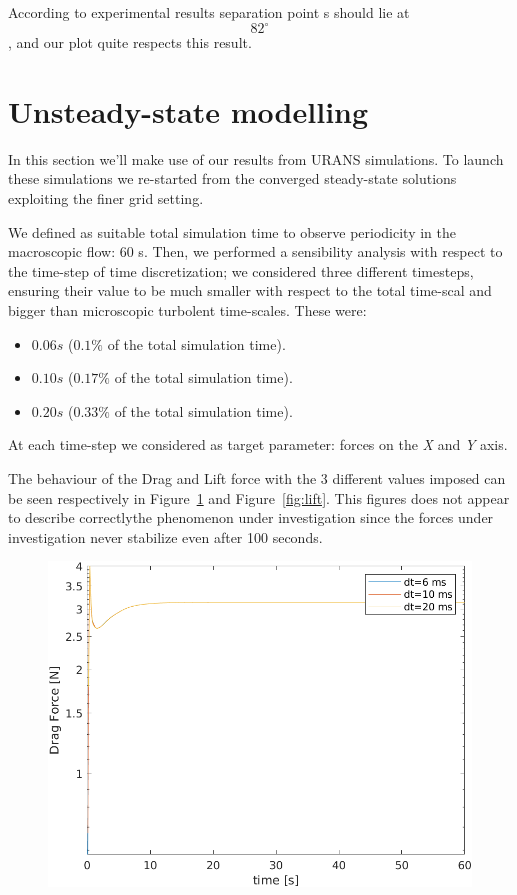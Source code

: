 \documentclass[12pt]{article}
\begin{document}
        According to experimental results separation point s should lie at $$ 82 ^\circ $$, and our plot quite respects this result.

\section{Unsteady-state modelling} \label{sec:URAN}
        In this section we'll make use of our results from URANS simulations. To launch these simulations we re-started from the converged steady-state solutions exploiting the finer grid setting.

        We defined as suitable total simulation time to observe periodicity in the macroscopic flow: 60 s. Then, we performed a sensibility analysis with respect to the time-step of time discretization; we considered three different timesteps, ensuring their value to be much smaller with respect to the total time-scal and bigger than microscopic turbolent time-scales. These were:

        \begin{itemize}
                \item $0.06 s$ ($0.1\%$ of the total simulation time).
                \item $0.10 s$ ($0.17\%$ of the total simulation time).
                \item $0.20 s$ ($0.33\%$ of the total simulation time).
        \end{itemize}
        
        At each time-step we considered as target parameter: forces on the \textit{X} and \textit{Y} axis.

        The behaviour of the Drag and Lift force with the 3 different values imposed can be seen respectively in Figure~\ref{fig:drag} and Figure~\ref{fig:lift}. This figures does not appear to describe correctlythe phenomenon under investigation since the forces under investigation never stabilize even after 100 seconds.

        \begin{figure}[!ht]
                \includegraphics[width=\textwidth]{DragForce.png}
                \centering
                \caption{}
                \label{fig:drag}
        \end{figure}
\end{document}
